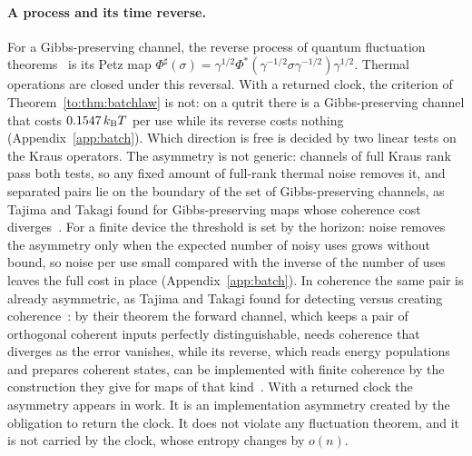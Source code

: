 \paragraph{A process and its time reverse.} For a Gibbs-preserving channel, the reverse process of quantum fluctuation theorems~\cite{Crooks08,KwonKim19} is its Petz map $\Phi^\sharp(\sigma)=\gamma^{1/2}\Phi^*(\gamma^{-1/2}\sigma\gamma^{-1/2})\gamma^{1/2}$. Thermal operations are closed under this reversal. With a returned clock, the criterion of Theorem~\ref{to:thm:batchlaw} is not: on a qutrit there is a Gibbs-preserving channel that costs $0.1547\,k_{\mathrm B} T$ per use while its reverse costs nothing (Appendix~\ref{app:batch}). Which direction is free is decided by two linear tests on the Kraus operators. The asymmetry is not generic: channels of full Kraus rank pass both tests, so any fixed amount of full-rank thermal noise removes it, and separated pairs lie on the boundary of the set of Gibbs-preserving channels, as Tajima and Takagi found for Gibbs-preserving maps whose coherence cost diverges~\cite[Suppl.\ Prop.~S.11]{TajimaTakagi25}. For a finite device the threshold is set by the horizon: noise removes the asymmetry only when the expected number of noisy uses grows without bound, so noise per use small compared with the inverse of the number of uses leaves the full cost in place (Appendix~\ref{app:batch}). In coherence the same pair is already asymmetric, as Tajima and Takagi found for detecting versus creating coherence~\cite{TajimaTakagi25}: by their theorem the forward channel, which keeps a pair of orthogonal coherent inputs perfectly distinguishable, needs coherence that diverges as the error vanishes, while its reverse, which reads energy populations and prepares coherent states, can be implemented with finite coherence by the construction they give for maps of that kind~\cite[Suppl.\ Sec.~IV]{TajimaTakagi25}. With a returned clock the asymmetry appears in work. It is an implementation asymmetry created by the obligation to return the clock. It does not violate any fluctuation theorem, and it is not carried by the clock, whose entropy changes by $o(n)$.

